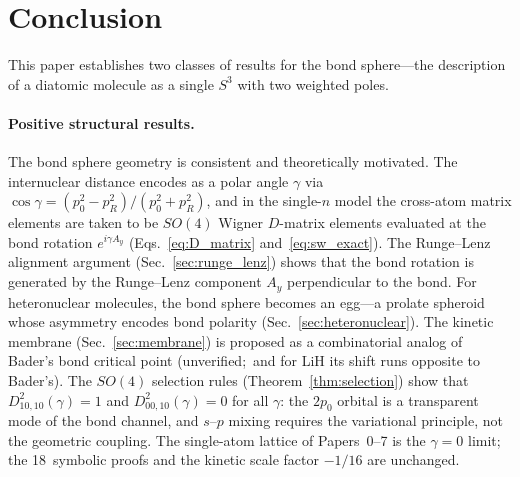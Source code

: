 \documentclass[aps,pra,twocolumn,superscriptaddress,longbibliography]{revtex4-2}
\theoremstyle{remark}
\theoremstyle{plain}
\begin{document}
\section{Conclusion}
\label{sec:conclusion}

This paper establishes two classes of results for the bond sphere---the
description of a diatomic molecule as a single $S^3$ with two weighted
poles.

\paragraph{Positive structural results.}
The bond sphere geometry is consistent and theoretically motivated.
The internuclear distance encodes as a polar angle $\gamma$ via
$\cos\gamma = (p_0^2 - p_R^2)/(p_0^2 + p_R^2)$, and in the single-$n$
model the cross-atom matrix elements are taken to be $SO(4)$ Wigner
$D$-matrix elements evaluated at the bond rotation $e^{i\gamma A_y}$
(Eqs.~\eqref{eq:D_matrix} and~\eqref{eq:sw_exact}).  The
Runge--Lenz alignment argument (Sec.~\ref{sec:runge_lenz}) shows that
the bond rotation is generated by the Runge--Lenz component $A_y$
perpendicular to the bond.  For heteronuclear molecules, the bond sphere becomes an
egg---a prolate spheroid whose asymmetry encodes bond polarity
(Sec.~\ref{sec:heteronuclear}).  The kinetic membrane
(Sec.~\ref{sec:membrane}) is proposed as a combinatorial analog of Bader's
bond critical point (unverified;\ and for LiH its shift runs opposite to
Bader's).  The $SO(4)$ selection rules
(Theorem~\ref{thm:selection}) show that $D^2_{10,10}(\gamma) = 1$ and
$D^2_{00,10}(\gamma) = 0$ for all $\gamma$: the $2p_0$ orbital is a
transparent mode of the bond channel, and $s$--$p$ mixing requires the
variational principle, not the geometric coupling.  The single-atom
lattice of Papers~0--7 is the $\gamma = 0$ limit; the 18~symbolic
proofs and the kinetic scale factor $-1/16$ are unchanged.
\end{document}
